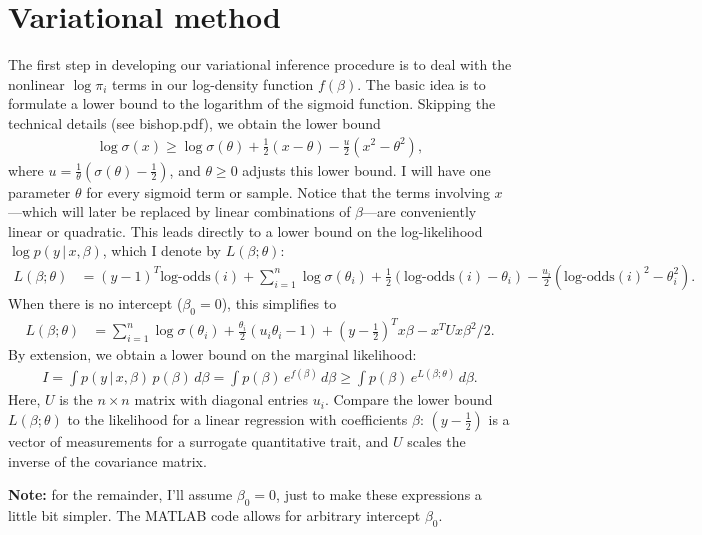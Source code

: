 \documentclass[final]{siamltex}
\newcommand{\smfrac}[2]{{\textstyle\frac{#1}{#2}}}
\newcommand{\half}{{\textstyle\frac{1}{2}}}
\newcommand{\smint}{\textstyle\int}
\newcommand{\logodds}{\mbox{log-odds}}
\begin{document}
\section*{Variational method}

The first step in developing our variational inference procedure is to
deal with the nonlinear $\log\pi_i$ terms in our log-density function
$f(\beta)$. The basic idea is to formulate a lower bound to the
logarithm of the sigmoid function. Skipping the technical details (see
bishop.pdf), we obtain the lower bound
\begin{align*}
\log\sigma(x) \geq 
\log\sigma(\theta) + \half(x-\theta) - \smfrac{u}{2}(x^2-\theta^2),
\end{align*}
where $u = \frac{1}{\theta}(\sigma(\theta) - \half)$, and $\theta \geq
0$ adjusts this lower bound. I will have one parameter $\theta$ for
every sigmoid term or sample. Notice that the terms involving
$x$---which will later be replaced by linear combinations of
$\beta$---are conveniently linear or quadratic. This leads directly to
a lower bound on the log-likelihood $\log p(y \,|\, x, \beta)$, which
I denote by $L(\beta; \theta)$:
\begin{align*}
L(\beta; \theta) &= 
(y-1)^T\logodds(i) + \sum_{i=1}^n \log\sigma(\theta_i) 
+ \half(\logodds(i) - \theta_i) 
- \smfrac{u_i}{2}(\logodds(i)^2 - \theta_i^2).
\end{align*}
When there is no intercept ($\beta_0 = 0$), this simplifies to
\begin{align*}
L(\beta; \theta) &= \sum_{i=1}^n \log\sigma(\theta_i) +
\smfrac{\theta_i}{2}(u_i\theta_i - 1)
+ (y-\half)^Tx\beta - x^TUx\beta^2/2.
\end{align*}
By extension, we obtain a lower bound on the marginal likelihood:
\begin{align*}
I 
= \smint p(y \,|\, x, \beta) \, p(\beta) \, d\beta 
= \smint p(\beta) \, e^{f(\beta)} \, d\beta 
\geq \smint p(\beta) \, e^{L(\beta; \theta)} \, d\beta.
\end{align*}
Here, $U$ is the $n \times n$ matrix with diagonal entries $u_i$.
Compare the lower bound $L(\beta; \theta)$ to the likelihood for a
linear regression with coefficients $\beta$: $(y - \half)$ is a vector
of measurements for a surrogate quantitative trait, and $U$ scales the
inverse of the covariance matrix.

{\bf Note:} for the remainder, I'll assume $\beta_0 = 0$, just to make
these expressions a little bit simpler. The MATLAB code allows for
arbitrary intercept $\beta_0$.
\end{document}
